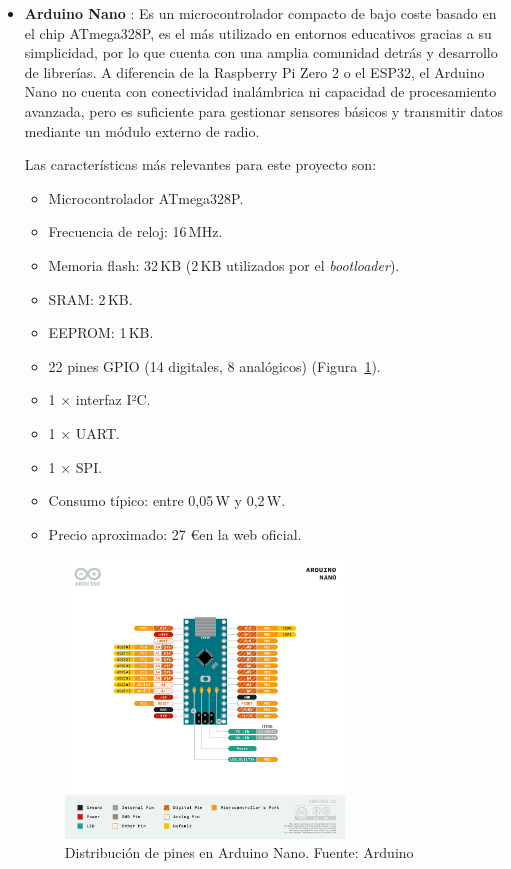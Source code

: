 \begin{itemize}
    \item \textbf{Arduino Nano} \cite{arduino_nano}:
    Es un microcontrolador compacto de bajo coste basado en el chip ATmega328P, es el más utilizado en entornos educativos gracias a su simplicidad,
    por lo que cuenta con una amplia comunidad detrás y desarrollo de librerías.
    A diferencia de la Raspberry Pi Zero 2 o el ESP32, el Arduino Nano no cuenta con conectividad inalámbrica ni capacidad de procesamiento avanzada,
    pero es suficiente para gestionar sensores básicos y transmitir datos mediante un módulo externo de radio.

    Las características más relevantes para este proyecto son:
    \begin{itemize}
        \item Microcontrolador ATmega328P.
        \item Frecuencia de reloj: 16\,MHz.
        \item Memoria flash: 32\,KB (2\,KB utilizados por el \emph{bootloader}).
        \item SRAM: 2\,KB.
        \item EEPROM: 1\,KB.
        \item 22 pines GPIO (14 digitales, 8 analógicos) (Figura~\ref{fig:arduino_nano_gpio}).
        \item 1 × interfaz I²C.
        \item 1 × UART.
        \item 1 × SPI.
        \item Consumo típico: entre 0,05\,W y 0,2\,W.
        \item Precio aproximado: 27 \euro en la web oficial.
    \end{itemize}

    \begin{figure}[H]
        \centering
        \includegraphics[width=0.7\textwidth]{Imagenes/Bitmap/arduinoNanogpio}
        \caption{Distribución de pines en Arduino Nano. Fuente: Arduino~\cite{arduino_nano_gpio}}
        \label{fig:arduino_nano_gpio}
    \end{figure}


\end{itemize}
